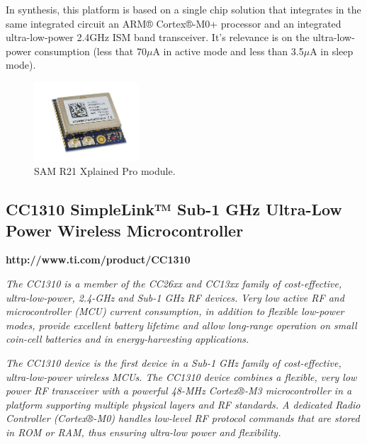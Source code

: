 In synthesis, this platform is based on a single chip solution that integrates in the same integrated circuit an ARM® Cortex®-M0+ processor and an integrated ultra-low-power 2.4GHz ISM
band transceiver. It's relevance is on the ultra-low-power consumption (less that 70$\mu$A in active mode and less than 3.5$\mu$A in sleep mode).

\begin{figure}[h!]
	\centering
	\includegraphics[width=0.35\textwidth,keepaspectratio]{figures/samr21}
	\caption{SAM R21 Xplained Pro module.}

\end{figure}

\newpage
\subsection{CC1310 SimpleLink™ Sub-1 GHz Ultra-Low Power Wireless Microcontroller}

\begin{mdframed}[	linecolor=black, outerlinewidth=5pt]
	\textbf{http://www.ti.com/product/CC1310} 
	
	\small
	\textit{The CC1310 is a member of the CC26xx and CC13xx family of cost-effective, ultra-low-power, 2.4-GHz and Sub-1 GHz RF devices. Very low active RF and microcontroller (MCU) current consumption, in addition to flexible low-power modes, provide excellent battery lifetime and allow long-range operation on small coin-cell batteries and in energy-harvesting applications.}
	
	\textit{The CC1310 device is the first device in a Sub-1 GHz family of cost-effective, ultra-low-power wireless MCUs. The CC1310 device combines a flexible, very low power RF transceiver with a powerful 48-MHz Cortex®-M3 microcontroller in a platform supporting multiple physical layers and RF standards. A dedicated Radio Controller (Cortex®-M0) handles low-level RF protocol commands that are stored in ROM or RAM, thus ensuring ultra-low power and flexibility.}	
\end{mdframed}



